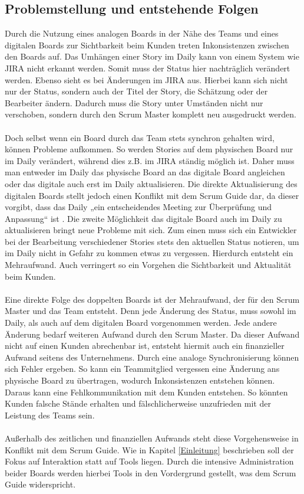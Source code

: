 \documentclass[12pt,titlepage]{scrartcl}
\begin{document}
		\subsection{Problemstellung und entstehende Folgen} \label{Problemstellung}
		Durch die Nutzung eines analogen Boards in der Nähe des Teams und eines digitalen Boards zur Sichtbarkeit beim Kunden treten Inkonsistenzen zwischen den Boards auf. Das Umhängen einer Story im Daily kann von einem System wie JIRA nicht erkannt werden. Somit muss der Status hier nachträglich verändert werden. Ebenso sieht es bei Änderungen im JIRA aus. Hierbei kann sich nicht nur der Status, sondern auch der Titel der Story, die Schätzung oder der Bearbeiter ändern. Dadurch muss die Story unter Umständen nicht nur verschoben, sondern durch den Scrum Master komplett neu ausgedruckt werden. \\ \\
		Doch selbst wenn ein Board durch das Team stets synchron gehalten wird, können Probleme aufkommen. So werden Stories auf dem physischen Board nur im Daily verändert, während dies z.B. im JIRA ständig möglich ist. Daher muss man entweder im Daily das physische Board an das digitale Board angleichen oder das digitale auch erst im Daily aktualisieren. Die direkte Aktualisierung des digitalen Boards stellt jedoch einen Konflikt mit dem Scrum Guide dar, da dieser vorgibt, dass das Daily „ein entscheidendes Meeting zur Überprüfung und Anpassung“ ist \cite{guide}. Die zweite Möglichkeit das digitale Board auch im Daily zu aktualisieren bringt neue Probleme mit sich. Zum einen muss sich ein Entwickler bei der Bearbeitung verschiedener Stories stets den aktuellen Status notieren, um im Daily nicht in Gefahr zu kommen etwas zu vergessen. Hierdurch entsteht ein Mehraufwand. Auch verringert so ein Vorgehen die Sichtbarkeit und Aktualität beim Kunden.	
		\\ \\
		Eine direkte Folge des doppelten Boards ist der Mehraufwand, der für den Scrum Master und das Team entsteht. Denn jede Änderung des Status, muss sowohl im Daily, als auch auf dem digitalen Board vorgenommen werden. Jede andere Änderung bedarf weiteren Aufwand durch den Scrum Master. Da dieser Aufwand nicht auf einen Kunden abrechenbar ist, entsteht hiermit auch ein finanzieller Aufwand seitens des Unternehmens. Durch eine analoge Synchronisierung können sich Fehler ergeben. So kann ein Teammitglied vergessen eine Änderung ans physische Board zu übertragen, wodurch Inkonsistenzen entstehen können. Daraus kann eine Fehlkommunikation mit dem Kunden entstehen. So könnten Kunden falsche Stände erhalten und fälschlicherweise unzufrieden mit der Leistung des Teams sein. \\ \\
		Außerhalb des zeitlichen und finanziellen Aufwands steht diese Vorgehensweise in Konflikt mit dem Scrum Guide. Wie in Kapitel \ref{Einleitung} beschrieben soll der Fokus auf Interaktion statt auf Tools liegen. Durch die intensive Administration beider Boards werden hierbei Tools in den Vordergrund gestellt, was dem Scrum Guide widerspricht.
\end{document}
